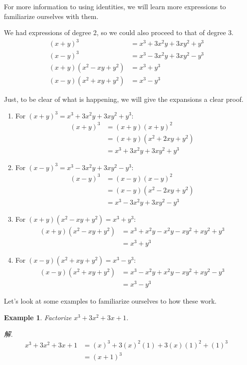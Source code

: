 \documentclass[12pt]{article}
\newtheorem{example}{Example}
\begin{document}
    For more information to using identities, we will learn more expressions to familiarize ourselves with them.

    We had expressions of degree 2, so we could also proceed to that of degree 3.\begin{align*}
        (x+y)^3&=x^3+3x^2y+3xy^2+y^3\\
        (x-y)^3&=x^3-3x^2y+3xy^2-y^3\\
        (x+y)(x^2-xy+y^2)&=x^3+y^3\\
        (x-y)(x^2+xy+y^2)&=x^3-y^3
    \end{align*}

    Just, to be clear of what is happening, we will give the expansions a clear proof.\begin{enumerate}
        \item For $(x+y)^3=x^3+3x^2y+3xy^2+y^3$:\begin{align*}
            (x+y)^3&=(x+y)(x+y)^2\\
            &=(x+y)(x^2+2xy+y^2)\\
            &=x^3+3x^2y+3xy^2+y^3
        \end{align*}
        \item For $(x-y)^3=x^3-3x^2y+3xy^2-y^3$:\begin{align*}
            (x-y)^3&=(x-y)(x-y)^2\\
            &=(x-y)(x^2-2xy+y^2)\\
            &=x^3-3x^2y+3xy^2-y^3
        \end{align*}
        \item For $(x+y)(x^2-xy+y^2)=x^3+y^3$:\begin{align*}
            (x+y)(x^2-xy+y^2)&=x^3+x^2y-x^2y-xy^2+xy^2+y^3\\
            &=x^3+y^3
        \end{align*}
        \item For $(x-y)(x^2+xy+y^2)=x^3-y^3$:\begin{align*}
            (x-y)(x^2+xy+y^2)&=x^3-x^2y+x^2y-xy^2+xy^2-y^3\\
            &=x^3-y^3
        \end{align*}
    \end{enumerate}
    
    Let's look at some examples to familiarize ourselves to how these work.

    \begin{example}
        Factorize $x^3+3x^2+3x+1$.
    \end{example}
    \textit{ 解. }\begin{align*}
        x^3+3x^2+3x+1&=(x)^3+3(x)^2(1)+3(x)(1)^2+(1)^3\\
        &=(x+1)^3
    \end{align*}
\end{document}
